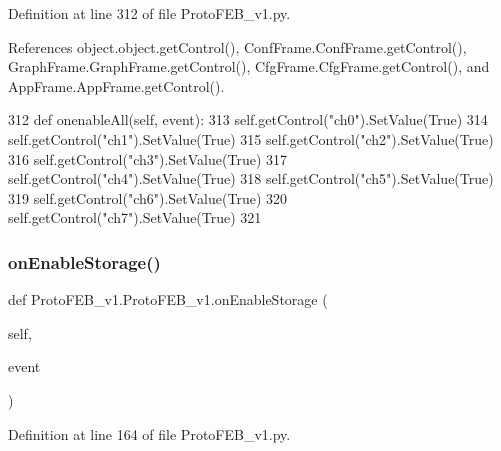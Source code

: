 Definition at line 312 of file Proto\+F\+E\+B\+\_\+v1.\+py.



References object.\+object.\+get\+Control(), Conf\+Frame.\+Conf\+Frame.\+get\+Control(), Graph\+Frame.\+Graph\+Frame.\+get\+Control(), Cfg\+Frame.\+Cfg\+Frame.\+get\+Control(), and App\+Frame.\+App\+Frame.\+get\+Control().


\begin{DoxyCode}
312     \textcolor{keyword}{def }onenableAll(self, event):
313         self.getControl(\textcolor{stringliteral}{"ch0"}).SetValue(\textcolor{keyword}{True})
314         self.getControl(\textcolor{stringliteral}{"ch1"}).SetValue(\textcolor{keyword}{True})
315         self.getControl(\textcolor{stringliteral}{"ch2"}).SetValue(\textcolor{keyword}{True})
316         self.getControl(\textcolor{stringliteral}{"ch3"}).SetValue(\textcolor{keyword}{True})
317         self.getControl(\textcolor{stringliteral}{"ch4"}).SetValue(\textcolor{keyword}{True})
318         self.getControl(\textcolor{stringliteral}{"ch5"}).SetValue(\textcolor{keyword}{True})
319         self.getControl(\textcolor{stringliteral}{"ch6"}).SetValue(\textcolor{keyword}{True})
320         self.getControl(\textcolor{stringliteral}{"ch7"}).SetValue(\textcolor{keyword}{True})
321 
\end{DoxyCode}
\mbox{\label{classProtoFEB__v1_1_1ProtoFEB__v1_a014b9b6ed64493754e2c759c01564f21}} 
\subsubsection{\texorpdfstring{on\+Enable\+Storage()}{onEnableStorage()}}
{\footnotesize\ttfamily def Proto\+F\+E\+B\+\_\+v1.\+Proto\+F\+E\+B\+\_\+v1.\+on\+Enable\+Storage (\begin{DoxyParamCaption}\item[{}]{self,  }\item[{}]{event }\end{DoxyParamCaption})}



Definition at line 164 of file Proto\+F\+E\+B\+\_\+v1.\+py.



